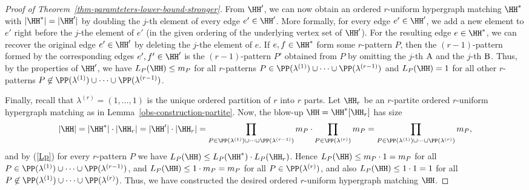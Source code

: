 \begin{proof}[Proof of Theorem~\ref{thm-paramteters-lower-bound-stronger}]
From $\HH'$, we can now obtain an ordered $r$-uniform hypergraph matching $\HH^*$ with $|\HH^*|=|\HH'|$ by doubling the $j$-th element of every edge $e'\in \HH'$. More formally, for every edge $e'\in \HH'$, we add a new element to $e'$ right before the $j$-the element of $e'$ (in the given ordering of the underlying vertex set of $\HH'$). For the resulting edge $e\in \HH^*$, we can recover the original edge $e'\in \HH'$ by deleting the $j$-the element of $e$. If $e,f\in \HH^*$ form some $r$-pattern $P$, then the $(r-1)$-pattern formed by the corresponding edges $e',f'\in \HH'$ is the $(r-1)$-pattern $P'$ obtained from $P$ by omitting the $j$-th $\rm A$ and the $j$-th $\rm B$. Thus, by the properties of $\HH'$, we have $L_P(\HH)\le m_P$ for all $r$-patterns $P\in \PP(\lambda^{(1)})\cup\dots\cup \PP(\lambda^{(r-1)})$ and $L_P(\HH)=1$ for all other $r$-patterns $P\not\in \PP(\lambda^{(1)})\cup\dots\cup \PP(\lambda^{(r-1)})$.

Finally, recall that $\lambda^{(r)}=(1,\dots,1)$ is the unique ordered partition of $r$ into $r$ parts. Let $\HH_r$ be an $r$-partite ordered $r$-uniform hypergraph matching as in Lemma~\ref{obs-construction-partite}. Now, the blow-up $\HH=\HH^*[\HH_r]$ has size
\[|\HH|=|\HH^*|\cdot |\HH_r|=|\HH'|\cdot |\HH_r|=\prod_{P\in \PP(\lambda^{(1)})\cup\dots\cup \PP(\lambda^{(r-1)})} m_{P}\cdot \prod_{P\in \PP(\lambda^{(r)})} m_{P}=\prod_{P\in \PP(\lambda^{(1)})\cup\dots\cup \PP(\lambda^{(r)})} m_{P},\]
and by (\ref{Lp}) for every $r$-pattern $P$ we have $L_P(\HH)\le L_P(\HH^*)\cdot L_P(\HH_r)$. Hence $L_P(\HH)\le m_P\cdot 1=m_P$ for all $P\in \PP(\lambda^{(1)})\cup\dots\cup \PP(\lambda^{(r-1)})$, and $L_P(\HH)\le 1\cdot m_P=m_P$ for all $P\in \PP(\lambda^{(r)})$, and also $L_P(\HH)\le 1\cdot 1=1$ for all $P\not\in \PP(\lambda^{(1)})\cup\dots\cup \PP(\lambda^{(r)})$. Thus, we have constructed the desired ordered $r$-uniform hypergraph matching $\HH$.
\end{proof}


